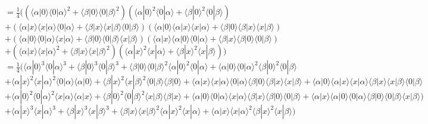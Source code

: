 \documentclass[a4paper]{scrartcl}
\begin{document}
\begin{enumerate}[a)]
$=\frac{1}{4} ((\langle \alpha|0\rangle \langle 0|\alpha\rangle^2 + \langle \beta|0\rangle \langle 0|\beta\rangle^2) (\langle \alpha|0\rangle^2 \langle 0|\alpha\rangle + \langle \beta|0\rangle^2 \langle 0|\beta\rangle)$\\
$+(\langle \alpha|x\rangle \langle x|\alpha\rangle\langle 0|\alpha\rangle + \langle \beta|x\rangle \langle x|\beta\rangle\langle 0|\beta\rangle) (\langle \alpha|0\rangle\langle \alpha|x\rangle \langle x|\alpha\rangle + \langle \beta|0\rangle\langle \beta|x\rangle \langle x|\beta\rangle) $\\
$+(\langle \alpha|0\rangle \langle 0|\alpha\rangle\langle x|\alpha\rangle + \langle \beta|0\rangle \langle 0|\beta\rangle\langle x|\beta\rangle) (\langle \alpha|x\rangle\langle \alpha|0\rangle \langle 0|\alpha\rangle + \langle \beta|x\rangle\langle \beta|0\rangle \langle 0|\beta\rangle) $\\
$+(\langle \alpha|x\rangle \langle x|\alpha\rangle^2 + \langle \beta|x\rangle \langle x|\beta\rangle^2) ( \langle\alpha|x\rangle^2 \langle x|\alpha\rangle + \langle \beta|x\rangle^2 \langle x|\beta\rangle))$\\

$=\frac{1}{4} (\langle \alpha|0\rangle^3 \langle 0|\alpha\rangle^3 + \langle \beta|0\rangle^3 \langle 0|\beta\rangle^3 + \langle \beta|0\rangle \langle 0|\beta\rangle^2 \langle \alpha|0\rangle^2 \langle 0|\alpha\rangle + \langle \alpha|0\rangle \langle 0|\alpha\rangle^2 \langle \beta|0\rangle^2 \langle 0|\beta\rangle$\\
$+\langle \alpha|x\rangle^2 \langle x|\alpha\rangle^2\langle 0|\alpha\rangle\langle \alpha|0\rangle + \langle \beta|x\rangle^2 \langle x|\beta\rangle^2\langle 0|\beta\rangle\langle \beta|0\rangle + \langle \alpha|x\rangle \langle x|\alpha\rangle\langle 0|\alpha\rangle  \langle \beta|0\rangle\langle \beta|x\rangle \langle x|\beta\rangle + \langle \alpha|0\rangle\langle \alpha|x\rangle \langle x|\alpha\rangle \langle \beta|x\rangle \langle x|\beta\rangle\langle 0|\beta\rangle$\\
$+\langle \alpha|0\rangle^2 \langle 0|\alpha\rangle^2\langle x|\alpha\rangle\langle \alpha|x\rangle + \langle \beta|0\rangle^2 \langle 0|\beta\rangle^2\langle x|\beta\rangle\langle \beta|x\rangle + \langle \alpha|0\rangle \langle 0|\alpha\rangle\langle x|\alpha\rangle \langle \beta|x\rangle\langle \beta|0\rangle \langle 0|\beta\rangle + \langle \alpha|x\rangle\langle \alpha|0\rangle \langle 0|\alpha\rangle \langle \beta|0\rangle \langle 0|\beta\rangle\langle x|\beta\rangle)$\\
$+\langle \alpha|x\rangle^3 \langle x|\alpha\rangle^3 + \langle \beta|x\rangle^3 \langle x|\beta\rangle^3 + \langle \beta|x\rangle \langle x|\beta\rangle^2 \langle \alpha|x\rangle^2 \langle x|\alpha\rangle + \langle \alpha|x\rangle \langle x|\alpha\rangle^2 \langle \beta|x\rangle^2 \langle x|\beta\rangle)$\\


\end{enumerate}
\end{document}
